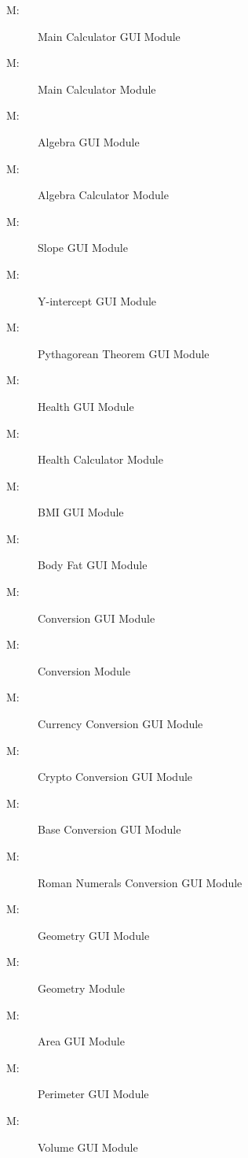 \documentclass[12pt, titlepage]{article}
\newcounter{mnum}
\newcommand{\mthemnum}{M\themnum}
\begin{document}
\begin{description}
\item [ \mthemnum \label{m1}:] Main Calculator GUI Module
\item [ \mthemnum \label{m2}:] Main Calculator Module

\item [ \mthemnum \label{m3}:] Algebra GUI Module
\item [ \mthemnum \label{m4}:] Algebra Calculator Module
\item [ \mthemnum \label{m5}:] Slope GUI Module
\item [ \mthemnum \label{m6}:] Y-intercept GUI Module
\item [ \mthemnum \label{m7}:] Pythagorean Theorem GUI Module

\item [ \mthemnum \label{m8}:] Health GUI Module
\item [ \mthemnum \label{m9}:] Health Calculator Module
\item [ \mthemnum \label{m10}:] BMI GUI Module
\item [ \mthemnum \label{m11}:] Body Fat GUI Module

\item [ \mthemnum \label{m12}:] Conversion GUI Module
\item [ \mthemnum \label{m13}:] Conversion Module
\item [ \mthemnum \label{m14}:] Currency Conversion GUI Module
\item [ \mthemnum \label{m15}:] Crypto Conversion GUI Module
\item [ \mthemnum \label{m16}:] Base Conversion GUI Module
\item [ \mthemnum \label{m17}:] Roman Numerals Conversion GUI Module


\item [ \mthemnum \label{m18}:] Geometry GUI Module
\item [ \mthemnum \label{m19}:] Geometry Module
\item [ \mthemnum \label{m20}:] Area GUI Module
\item [ \mthemnum \label{m21}:] Perimeter GUI Module
\item [ \mthemnum \label{m22}:] Volume GUI Module


\end{description}
\end{document}
